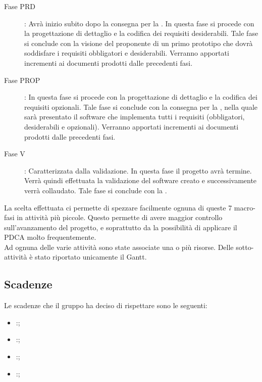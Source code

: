 \begin{description}
			\item[Fase PRD]: Avrà inizio subito dopo la consegna per la . In questa fase si procede con la progettazione di dettaglio e la codifica dei requisiti desiderabili. Tale fase si conclude con la visione del proponente di un primo prototipo che dovrà soddisfare i requisiti obbligatori e desiderabili. Verranno apportati incrementi ai documenti prodotti dalle precedenti fasi.
			\item[Fase PROP]: In questa fase si procede con la progettazione di dettaglio e la codifica dei requisiti opzionali. Tale fase si conclude con la consegna per la , nella quale sarà presentato il software che implementa tutti i requisiti (obbligatori, desiderabili e opzionali). Verranno apportati incrementi ai documenti prodotti dalle precedenti fasi.
			\item[Fase V]: Caratterizzata dalla validazione. In questa fase il progetto avrà termine. Verrà quindi effettuata la validazione del software creato e successivamente verrà collaudato. Tale fase si conclude con la .
		\end{description}
		La scelta effettuata ci permette di spezzare facilmente ognuna di queste 7 macro-fasi in attività più piccole. Questo permette di avere maggior controllo sull'avanzamento del progetto, e soprattutto da la possibilità di applicare il PDCA molto frequentemente.\\Ad ognuna delle varie attività sono state associate una o più risorse. Delle sotto-attività è stato riportato unicamente il Gantt.
	\subsection{Scadenze}
		Le scadenze che il gruppo \groupname ha deciso di rispettare sono le seguenti:
		\begin{itemize}
			\item {}:;
			\item {}:;
			\item {}:;
			\item {}:;
		\end{itemize}
